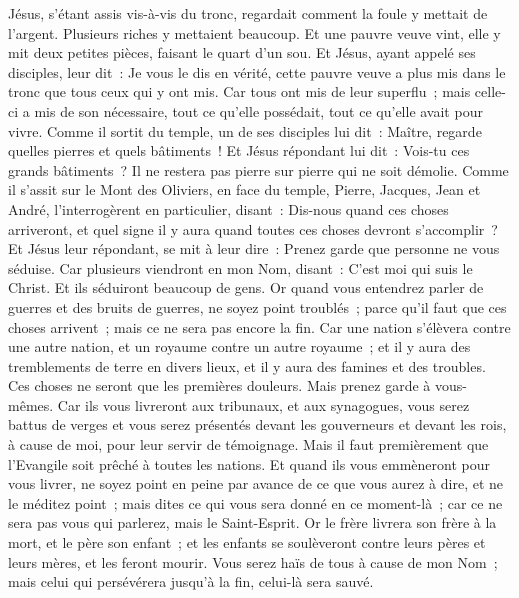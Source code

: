 \begin{multicols}{2}
Jésus, s'étant assis vis-à-vis du tronc, regardait comment la foule y mettait de l'argent. Plusieurs riches y mettaient beaucoup.
Et une pauvre veuve vint, elle y mit deux petites pièces, faisant le quart d'un sou.
Et Jésus, ayant appelé ses disciples, leur dit~: Je vous le dis en vérité, cette pauvre veuve a plus mis dans le tronc que tous ceux qui y ont mis.
Car tous ont mis de leur superflu~; mais celle-ci a mis de son nécessaire, tout ce qu'elle possédait, tout ce qu'elle avait pour vivre.
\VerseOne{}Comme il sortit du temple, un de ses disciples lui dit~: Maître, regarde quelles pierres et quels bâtiments~!
Et Jésus répondant lui dit~: Vois-tu ces grands bâtiments~? Il ne restera pas pierre sur pierre qui ne soit démolie.
Comme il s'assit sur le Mont des Oliviers, en face du temple, Pierre, Jacques, Jean et André, l'interrogèrent en particulier,
disant~: Dis-nous quand ces choses arriveront, et quel signe il y aura quand toutes ces choses devront s'accomplir~?
Et Jésus leur répondant, se mit à leur dire~: Prenez garde que personne ne vous séduise.
Car plusieurs viendront en mon Nom, disant~: C'est moi qui suis le Christ. Et ils séduiront beaucoup de gens.
Or quand vous entendrez parler de guerres et des bruits de guerres, ne soyez point troublés~; parce qu'il faut que ces choses arrivent~; mais ce ne sera pas encore la fin.
Car une nation s'élèvera contre une autre nation, et un royaume contre un autre royaume~; et il y aura des tremblements de terre en divers lieux, et il y aura des famines et des troubles. Ces choses ne seront que les premières douleurs.
Mais prenez garde à vous-mêmes. Car ils vous livreront aux tribunaux, et aux synagogues, vous serez battus de verges et vous serez présentés devant les gouverneurs et devant les rois, à cause de moi, pour leur servir de témoignage.
Mais il faut premièrement que l'Evangile soit prêché à toutes les nations.
Et quand ils vous emmèneront pour vous livrer, ne soyez point en peine par avance de ce que vous aurez à dire, et ne le méditez point~; mais dites ce qui vous sera donné en ce moment-là~; car ce ne sera pas vous qui parlerez, mais le Saint-Esprit.
Or le frère livrera son frère à la mort, et le père son enfant~; et les enfants se soulèveront contre leurs pères et leurs mères, et les feront mourir.
Vous serez haïs de tous à cause de mon Nom~; mais celui qui persévérera jusqu'à la fin, celui-là sera sauvé.

\end{multicols}
